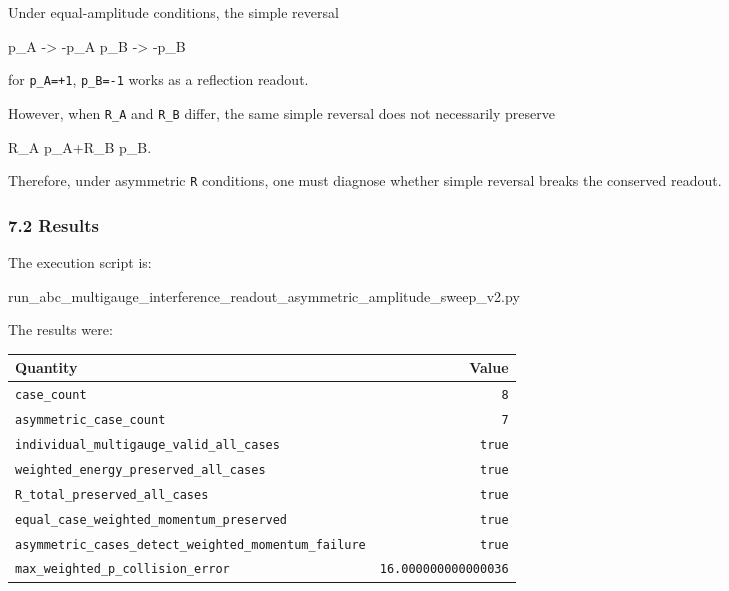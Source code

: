 \documentclass[
  a4paper,
]{article}
\newenvironment{Shaded}{}{}
\newcommand{\NormalTok}[1]{#1}
\newcounter{none} %
\begin{document}
Under equal-amplitude conditions, the simple reversal

\begin{Shaded}
\begin{Highlighting}[]
\NormalTok{p\_A {-}\textgreater{} {-}p\_A}
\NormalTok{p\_B {-}\textgreater{} {-}p\_B}
\end{Highlighting}
\end{Shaded}

for \texttt{p\_A=+1}, \texttt{p\_B=-1} works as a reflection readout.

However, when \texttt{R\_A} and \texttt{R\_B} differ, the same simple
reversal does not necessarily preserve

\begin{Shaded}
\begin{Highlighting}[]
\NormalTok{R\_A p\_A+R\_B p\_B.}
\end{Highlighting}
\end{Shaded}

Therefore, under asymmetric \texttt{R} conditions, one must diagnose
whether simple reversal breaks the conserved readout.

\subsubsection{7.2 Results}\label{results}

The execution script is:

\begin{Shaded}
\begin{Highlighting}[]
\NormalTok{run\_abc\_multigauge\_interference\_readout\_asymmetric\_amplitude\_sweep\_v2.py}
\end{Highlighting}
\end{Shaded}

The results were:

{\def\LTcaptype{none} %
\begin{longtable}[]{@{}lr@{}}
\toprule\noalign{}
Quantity & Value \\
\midrule\noalign{}
\endhead
\bottomrule\noalign{}
\endlastfoot
\texttt{case\_count} & \texttt{8} \\
\texttt{asymmetric\_case\_count} & \texttt{7} \\
\texttt{individual\_multigauge\_valid\_all\_cases} & \texttt{true} \\
\texttt{weighted\_energy\_preserved\_all\_cases} & \texttt{true} \\
\texttt{R\_total\_preserved\_all\_cases} & \texttt{true} \\
\texttt{equal\_case\_weighted\_momentum\_preserved} & \texttt{true} \\
\texttt{asymmetric\_cases\_detect\_weighted\_momentum\_failure} &
\texttt{true} \\
\texttt{max\_weighted\_p\_collision\_error} &
\texttt{16.000000000000036} \\
\end{longtable}
}
\end{document}
